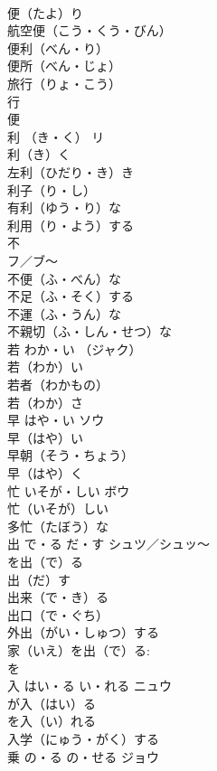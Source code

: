 \documentclass[8pt]{extreport}
\begin{document}
\begin{CJK}{UTF8}{min}
\\	便（たよ）り　
\\	航空便（こう・くう・びん）　
\\	便利（べん・り）　
\\	便所（べん・じょ）　
\\	旅行（りょ・こう） 
\\	行 
\\	便 
\\	利	（き・く）	リ	
\\	利（き）く　
\\	左利（ひだり・き）き　
\\	利子（り・し）　
\\	有利（ゆう・り）な　
\\	利用（り・よう）する　
\\	不	
\\	フ／ブ～	
\\	不便（ふ・べん）な　
\\	不足（ふ・そく）する　
\\	不運（ふ・うん）な　
\\	不親切（ふ・しん・せつ）な　
\\	若	わか・い	（ジャク）	
\\	若（わか）い　
\\	若者（わかもの）　
\\	若（わか）さ　
\\	早	はや・い	ソウ	
\\	早（はや）い　
\\	早朝（そう・ちょう）　
\\	早（はや）く　
\\	忙	いそが・しい	ボウ	
\\	忙（いそが）しい　
\\	多忙（たぼう）な　
\\	出	で・る だ・す	シュツ／シュッ～	
\\	を出（で）る　
\\	出（だ）す　
\\	出来（で・き）る　
\\	出口（で・ぐち）　
\\	外出（がい・しゅつ）する　
\\	家（いえ）を出（で）る: 
\\	を　
\\	入	はい・る い・れる	ニュウ	
\\	が入（はい）る　
\\	を入（い）れる　
\\	入学（にゅう・がく）する　
\\	乗	の・る の・せる	ジョウ	

\end{CJK}
\end{document}
